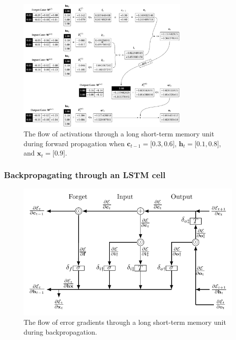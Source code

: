 \documentclass[xcolor={table}]{beamer}
\begin{document}
 \begin{frame} 
\begin{figure}[t]
\centerline{
\includegraphics[width=0.75\textwidth]{./images/fmlpda_8_41.pdf}
}
\caption{The flow of activations through a long short-term memory unit during forward propagation when $\mathbf{c}_{t{-}1}=\lbrack 0.3, 0.6\rbrack$, $\mathbf{h}_{t}=\lbrack 0.1, 0.8\rbrack$, and $\mathbf{x}_{t}=\lbrack 0.9 \rbrack$.}
\label{fig:lstm-forwardprop}
\end{figure}
\end{frame} 

\subsubsection{Backpropagating through an LSTM cell}

 \begin{frame} 
\begin{figure}[t]
\centerline{
\includegraphics[width=\textwidth]{./images/fmlpda_8_42.pdf}
}
\caption[The flow of error gradients through a long short-term memory unit during backpropagation.]{The flow of error gradients through a long short-term memory unit during backpropagation.}
\label{fig:lstm-backprop}
\end{figure}
\end{frame} 
\end{document}
